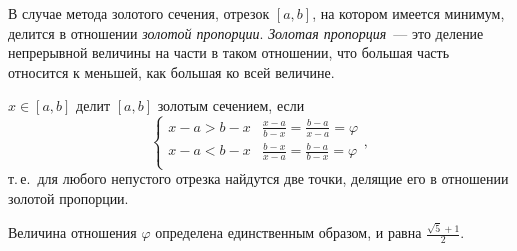 \documentclass[10pt,a4paper,titlepage]{article}
\begin{document}
В случае метода золотого сечения, отрезок $[a,b]$, на котором имеется минимум, делится в отношении 
\textit{золотой пропорции}.
\textit{Золотая пропорция}~--- это деление непрерывной величины на части в таком отношении, 
что большая часть относится к меньшей, как большая ко всей величине.

$x \in [a,b]$ делит $[a,b]$ золотым сечением, если 
$$
\begin{cases}
  x - a > b - x &  \frac{x - a}{b - x} = \frac{b - a}{x - a} = \varphi \\
  x - a < b - x &  \frac{b - x}{x - a} = \frac{b - a}{b - x} = \varphi \\
\end{cases},
$$
т.\,е.~для любого непустого отрезка найдутся две точки, делящие его в отношении золотой пропорции.

Величина отношения $\varphi$ определена единственным образом, и равна $\frac{\sqrt{5} + 1}{2}.$
\end{document}

